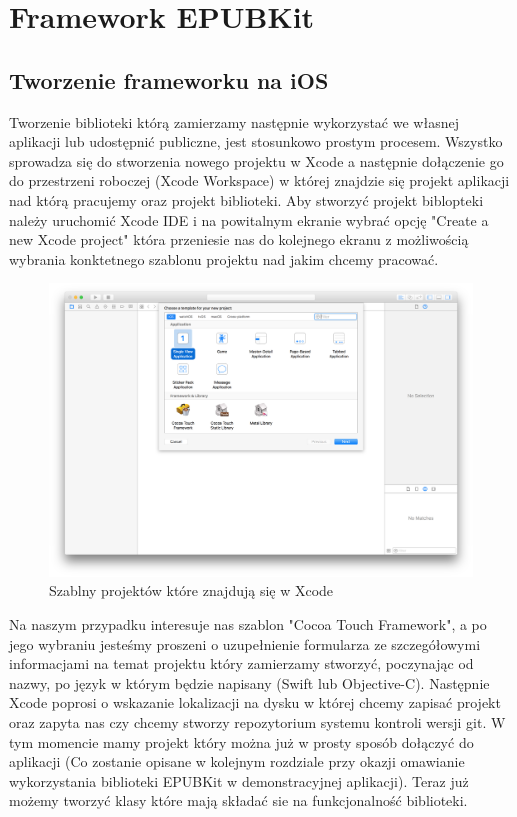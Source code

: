 \chapter{Framework EPUBKit}
\section{Tworzenie frameworku na iOS}

Tworzenie biblioteki którą zamierzamy następnie wykorzystać we własnej aplikacji lub udostępnić publiczne, jest stosunkowo prostym procesem. Wszystko sprowadza się do stworzenia nowego projektu w Xcode a następnie dołączenie go do przestrzeni roboczej (Xcode Workspace) w której znajdzie się projekt aplikacji nad którą pracujemy oraz projekt biblioteki. Aby stworzyć projekt biblopteki należy uruchomić Xcode IDE i na powitalnym ekranie wybrać opcję "Create a new Xcode project" która przeniesie nas do kolejnego ekranu z możliwością wybrania konktetnego szablonu projektu nad jakim chcemy pracować.

\begin{figure}[ht!]
  \centering
  \includegraphics[width=120mm]{images/chapter-4-image-1-new-project.png}
  \caption{Szablny projektów które znajdują się w Xcode}
  \label{chapter-4-image-1-new-project}
\end{figure}

Na naszym przypadku interesuje nas szablon "Cocoa Touch Framework", a po jego wybraniu jesteśmy proszeni o uzupełnienie formularza ze szczegółowymi informacjami na temat projektu który zamierzamy stworzyć, poczynając od nazwy, po język w którym będzie napisany (Swift lub Objective-C). Następnie Xcode poprosi o wskazanie lokalizacji na dysku w której chcemy zapisać projekt oraz zapyta nas czy chcemy stworzy repozytorium systemu kontroli wersji git. W tym momencie mamy projekt który można już w prosty sposób dołączyć do aplikacji (Co zostanie opisane w kolejnym rozdziale przy okazji omawianie wykorzystania biblioteki EPUBKit w demonstracyjnej aplikacji). Teraz już możemy tworzyć klasy które mają składać sie na funkcjonalność biblioteki.

